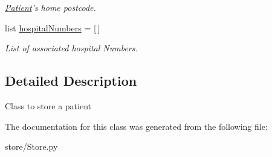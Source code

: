 \begin{DoxyCompactItemize}
\begin{DoxyCompactList}\small\item\em \hyperlink{classstore_1_1_store_1_1_patient}{Patient}'s home postcode. \end{DoxyCompactList}\item 
\hypertarget{classstore_1_1_store_1_1_patient_a29bbf4ed68bb94c1ccdb5bc9433f2c66}{list \hyperlink{classstore_1_1_store_1_1_patient_a29bbf4ed68bb94c1ccdb5bc9433f2c66}{hospital\-Numbers} = \mbox{[}$\,$\mbox{]}}\label{classstore_1_1_store_1_1_patient_a29bbf4ed68bb94c1ccdb5bc9433f2c66}

\begin{DoxyCompactList}\small\item\em List of associated hospital Numbers. \end{DoxyCompactList}\end{DoxyCompactItemize}


\subsection{Detailed Description}
\begin{DoxyVerb}Class to store a patient
\end{DoxyVerb}
 

The documentation for this class was generated from the following file\-:\begin{DoxyCompactItemize}
\item 
store/Store.\-py\end{DoxyCompactItemize}
